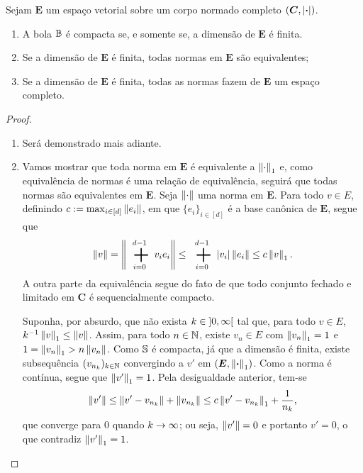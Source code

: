 \begin{proposition}
Sejam $\bm E$ um espaço vetorial sobre um corpo normado completo $(\bm C,\abs{\var})$.
	\begin{enumerate}
	\item A bola $\B$ é compacta se, e somente se, a dimensão de $\bm E$ é finita.
	\item Se a dimensão de $\bm E$ é finita, todas normas em $\bm E$ são equivalentes;
	\item Se a dimensão de $\bm E$ é finita, todas as normas fazem de $\bm E$ um espaço completo.
	\end{enumerate}
\end{proposition}
\begin{proof}
	\begin{enumerate}
	\item Será demonstrado mais adiante.

	\item Vamos mostrar que toda norma em $\bm E$ é equivalente a $\nor{\cdot}_1$ e, como equivalência de normas é uma relação de equivalência, seguirá que todas normas são equivalentes em $\bm E$. Seja $\nor{\cdot}$ uma norma em $\bm E$. Para todo $v \in E$, definindo $c := \max_{i \in [d]} \nor{e_i}$, em que $\{e_i\}_{i \in [d]}$ é a base canônica de $\bm E$, segue que
	\begin{equation*}
	\nor{v} = \nor{\sum_{i=0}^{d-1} v_ie_i} \leq \sum_{i=0}^{d-1}\abs{v_i}\nor{e_i} \leq c\nor{v}_1.
	\end{equation*}
A outra parte da equivalência segue do fato de que todo conjunto fechado e limitado em $\bm C$ é sequencialmente compacto.

Suponha, por absurdo, que não exista $k \in \intaa{0}{\infty}$ tal que, para todo $v \in E$, $k\inv\nor{v}_1 \leq \nor{v}$. Assim, para todo $n \in \N$, existe $v_n \in E$ com $\nor{v_n}_1 = 1$ e $1 = \nor{v_n}_1 > n\nor{v_n}$. Como $\S$ é compacta, já que a dimensão é finita, existe subsequência $(v_{n_k})_{k \in \N}$ convergindo a $v'$ em $(\bm E,\nor{\var}_1)$. Como a norma é contínua, segue que $\nor{v'}_1 = 1$. Pela desigualdade anterior, tem-se
	\begin{equation*}
	\nor{v'} \leq \nor{v' - v_{n_k}} + \nor{v_{n_k}} \leq c\nor{v' - v_{n_k}}_1 + \frac{1}{n_k},
	\end{equation*}
que converge para $0$ quando $k \conv \infty$; ou seja, $\nor{v'}=0$ e portanto $v'=0$, o que contradiz $\nor{v'}_1=1$.


\end{enumerate}
\end{proof}
